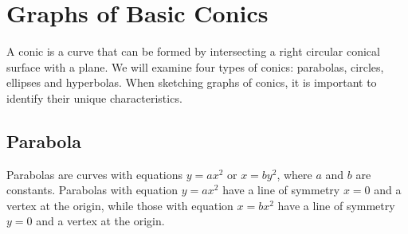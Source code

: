 \begin{minipage}{0.5\textwidth}
    \begin{figure}[H]
        \centering
        \captionsetup{singlelinecheck=false, aboveskip=7pt, belowskip=0pt,justification=centering}
        \setcapindent{0pt}
        \caption{}
    \end{figure}
\end{minipage}

\section{Graphs of Basic Conics}

A conic is a curve that can be formed by intersecting a right circular conical surface with a plane. We will examine four types of conics: parabolas, circles, ellipses and hyperbolas. When sketching graphs of conics, it is important to identify their unique characteristics.

\subsection{Parabola}

Parabolas are curves with equations $y = ax^2$ or $x = by^2$, where $a$ and $b$ are constants. Parabolas with equation $y = ax^2$ have a line of symmetry $x = 0$ and a vertex at the origin, while those with equation $x = bx^2$ have a line of symmetry $y = 0$ and a vertex at the origin.

